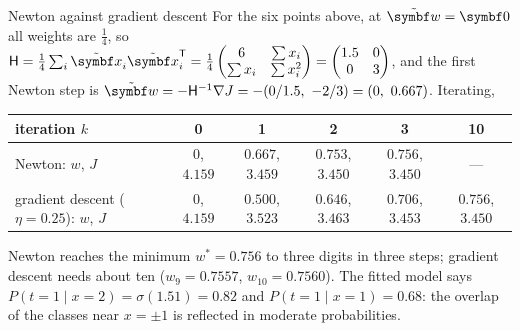 \documentclass[11pt]{article}
\newcommand{\w}{\vect{w}}
\newcommand{\xt}{\tilde{\x}}
\newcommand{\wt}{\tilde{\w}}
\newcommand{\Hess}{\mathsf{H}}
\begin{document}
\begin{worked}{Newton against gradient descent}
For the six points above, at $\wt = \vect{0}$ all weights are $\frac14$, so $\Hess = \frac14\sum_i \xt_i\xt_i\T =
\frac14\begin{pmatrix} 6 & \sum x_i \\ \sum x_i & \sum x_i^2\end{pmatrix} = \begin{pmatrix} 1.5 & 0 \\ 0 & 3\end{pmatrix}$, and
the first Newton step is $\wt = -\Hess^{-1}\nabla J = -(0/1.5,\ -2/3) = (0,\ 0.667)$. Iterating,
\begin{center}\small
\begin{tabular}{@{}lccccc@{}}
\toprule
iteration $k$ & 0 & 1 & 2 & 3 & 10 \\
\midrule
Newton: $w$, $J$ & $0$, $4.159$ & $0.667$, $3.459$ & $0.753$, $3.450$ & $0.756$, $3.450$ & --- \\
gradient descent ($\eta = 0.25$): $w$, $J$ & $0$, $4.159$ & $0.500$, $3.523$ & $0.646$, $3.463$ & $0.706$, $3.453$ &
$0.756$, $3.450$ \\
\bottomrule
\end{tabular}
\end{center}
Newton reaches the minimum $w^* = 0.756$ to three digits in three steps; gradient descent needs about ten
($w_9 = 0.7557$, $w_{10} = 0.7560$). The fitted model says
$P(t = 1 \mid x = 2) = \sigma(1.51) = 0.82$ and $P(t = 1 \mid x = 1) = 0.68$: the overlap of the classes near $x = \pm1$ is
reflected in moderate probabilities.
\end{worked}
\end{document}

